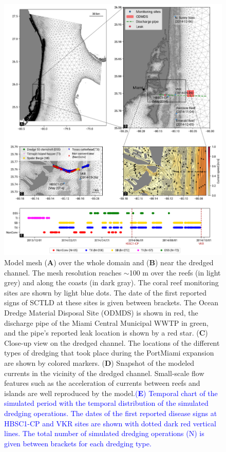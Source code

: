 \documentclass[preprint,12pt,authoryear]{elsarticle}
\newcommand{\modif}[1]{\textcolor{blue}{#1}}
\begin{document}
\begin{figure}
	\centering
	\includegraphics[width=\textwidth]{figures/fig_mesh_new_timeline.png}
    \caption{Model mesh (\textbf{A}) over the whole domain and (\textbf{B}) near the dredged channel. The mesh resolution reaches $\sim$100 m over the reefs (in light grey) and along the coasts (in dark gray). The coral reef monitoring sites are shown by light blue dots. The date of the first reported signs of SCTLD at these sites is given between brackets. The Ocean Dredge Material Disposal Site (ODMDS) is shown in red, the discharge pipe of the Miami Central Municipal WWTP in green, and the pipe's reported leak location is shown by a red star. (\textbf{C}) Close-up view on the dredged channel. The locations of the different types of dredging that took place during the PortMiami expansion are shown by colored markers. (\textbf{D}) Snapshot of the modeled currents in the vicinity of the dredged channel. Small-scale flow features such as the acceleration of currents between reefs and islands are well reproduced by the model.\modif{(\textbf{E}) Temporal chart of the simulated period with the temporal distribution of the simulated dredging operations. The dates of the first reported disease signs at HBSC1-CP and VKR sites are shown with dotted dark red vertical lines. The total number of simulated dredging operations (N) is given between brackets for each dredging type.}}
	\label{fig:onset_mesh}
\end{figure}
\end{document}

